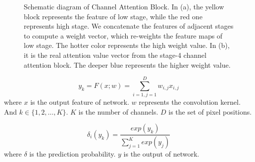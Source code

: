 \documentclass[10pt,twocolumn,letterpaper]{article}
\begin{document}
\begin{figure}[t]
\caption{Schematic diagram of Channel Attention Block. In (a), the yellow block represents the feature of low stage, while the red one represents high stage. We concatenate the features of adjacent stages to compute a weight vector, which re-weights the feature maps of low stage. The hotter color represents the high weight value. In (b), it is the real attention value vector from the stage-4 channel attention block. The deeper blue represents the higher weight value.}
\label{fig:channel-attetion}
\centering
\end{figure}

\begin{equation}
\label{eqn:eqn-sum}
y_k = F(x; w) = \sum_{i=1,j=1}^{D}w_{i,j}x_{i,j}
\end{equation}
where $x$ is the output feature of network. $w$ represents the convolution kernel. And $k \in \{1, 2, \ldots, K\}$. $K$ is the number of channels. $D$ is the set of pixel positions.

\begin{equation}
	\label{eqn:pred}
	\delta_{i}(y_k) = \frac{exp(y_k)}{\sum_{j=1}^K{exp(y_j)}}
\end{equation}
where $\delta$ is the prediction probability. $y$ is the output of network.
\end{document}
